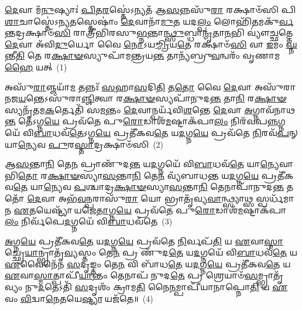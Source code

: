 \setcounter{anuvakam}{0}
\-\ul{𑌦𑍇}\-𑌵𑌾 𑌮᳴\-\ul{𑌨𑍁}\-𑌷𑍍𑌯𑌾𑌃॑ \ul{𑌪𑌿}\-𑌤\-\ul{𑌰}\-𑌸𑍍𑌤𑍇॑\-𑌽𑌨𑍍𑌯𑌤᳴ 𑌆\-\ul{𑌸}\-𑌨𑍍𑌨𑌸𑍁᳴\-\ul{𑌰𑌾} 𑌰𑌕𑍍𑌷𑌾𑍞᳴𑌸𑌿 𑌪𑌿\-\ul{𑌶𑌾}\-𑌚𑌾𑌸𑍍𑌤𑍇॑\-𑌽𑌨𑍍𑌯\-\ul{𑌤}\-𑌸𑍍𑌤𑍇𑌷𑌾𑌂॑ \ul{𑌦𑍇}\-𑌵𑌾𑌨𑌾᳴\-\ul{𑌮𑍁}\-𑌤 𑌯𑌦\-\ul{𑌲𑍍𑌪𑌂} 𑌲𑍋𑌹𑌿᳴\-\ul{𑌤}\-𑌮𑌕𑍁᳴\-\ul{𑌰𑍍𑌵}\-𑌨𑍍𑌤𑌦𑍍𑌰𑌕𑍍𑌷𑌾𑍞᳴\-\ul{𑌸𑌿} 𑌰𑌾𑌤𑍍𑌰𑍀᳴𑌭𑌿𑌰𑌸𑍁\-\ul{𑌭𑍍𑌨}\-𑌨𑍍𑌤𑌾\-\ul{𑌨𑍍𑌥𑍍𑌸𑍁}\-𑌬𑍍𑌧𑌾\-\ul{𑌨𑍍𑌮𑍃}\-𑌤𑌾\-\ul{𑌨}\-𑌭𑌿 𑌵𑍍𑌯𑍗॑\-\ul{𑌚𑍍𑌛}\-𑌤𑍍𑌤𑍇 \ul{𑌦𑍇}\-𑌵𑌾 𑌅᳴𑌵𑌿\-\ul{𑌦𑍁}\-𑌰𑍍𑌯𑍋 𑌵𑍈 \ul{𑌨𑍋}\-\-𑌽𑌯\-\ul{𑌮𑍍𑌮𑍍𑌰𑌿}\-𑌯\-\ul{𑌤𑍇} 𑌰𑌕𑍍𑌷𑌾𑍞᳴\-\ul{𑌸𑌿} 𑌵𑌾 \ul{𑌇}\-𑌮𑌂 \ul{𑌘𑍍𑌨}\-𑌨𑍍𑌤𑍀\-\ul{𑌤𑌿} 𑌤𑍇 𑌰\-\ul{𑌕𑍍𑌷𑌾}\-\-\ul{𑍟}\-𑌸𑍍𑌯𑍁𑌪𑌾᳴𑌮𑌨𑍍𑌤𑍍𑌰𑌯\-\ul{𑌨𑍍𑌤} 𑌤𑌾𑌨𑍍𑌯᳴𑌬𑍍𑌰𑍁\-\ul{𑌵}\-𑌨𑍍𑌵𑌰𑌂᳴ 𑌵𑍃𑌣𑌾𑌮\-\ul{𑌹𑍈} 𑌯𑌤𑍍~(1)

𑌅𑌸𑍁᳴\-\ul{𑌰𑌾}\-𑌞𑍍𑌜𑌯𑌾᳴\-\ul{𑌮} 𑌤𑌨𑍍𑌨𑌃᳴ \ul{𑌸}\-𑌹𑌾\-\ul{𑌸}\-𑌦𑌿\-\ul{𑌤𑌿} 𑌤\-\ul{𑌤𑍋} 𑌵𑍈 \ul{𑌦𑍇}\-𑌵𑌾 𑌅𑌸𑍁᳴𑌰𑌾𑌨𑌜\-\ul{𑌯}\-𑌨𑍍𑌤𑍇\-𑌽𑌸𑍁᳴𑌰𑌾\-\ul{𑌞𑍍𑌜𑌿}\-𑌤𑍍𑌵𑌾 𑌰\-\ul{𑌕𑍍𑌷𑌾}\-\-\ul{𑍟}\-𑌸𑍍𑌯𑌪𑌾᳴𑌨𑍁𑌦\-\ul{𑌨𑍍𑌤} 𑌤𑌾\-\ul{𑌨𑌿} 𑌰\-\ul{𑌕𑍍𑌷𑌾}\-\-\ul{𑍟}\-𑌸𑍍𑌯𑌨𑍃᳴𑌤𑌮\-\ul{𑌕}\-𑌰𑍍𑌤𑍇𑌤𑌿᳴ 𑌸\-\ul{𑌮}\-𑌨𑍍𑌤𑌂 \ul{𑌦𑍇}\-𑌵𑌾𑌨𑍍𑌪𑌰𑍍𑌯᳴𑌵𑌿\-\ul{𑌶}\-𑌨𑍍𑌤𑍇 \ul{𑌦𑍇}\-𑌵𑌾 \ul{𑌅}\-𑌗𑍍𑌨𑌾𑌵᳴𑌨𑌾𑌥\-\ul{𑌨𑍍𑌤} 𑌤𑍇॑\-𑌽𑌗𑍍𑌨\-\ul{𑌯𑍇} 𑌪𑍍𑌰𑌵᳴𑌤𑍇 𑌪𑍁\-\ul{𑌰𑍋}\-𑌡𑌾𑌶᳴\-\-\ul{𑌮}\-𑌷𑍍𑌟𑌾\-𑌕᳴𑌪𑌾\-\ul{𑌲𑌂} 𑌨𑌿𑌰᳴𑌵𑌪\-\ul{𑌨𑍍𑌨}\-𑌗𑍍𑌨𑌯𑍇᳴ 𑌵𑌿\-\ul{𑌬𑌾}\-𑌧𑌵᳴\-\ul{𑌤𑍇}\-\-𑌽𑌗𑍍𑌨\-\ul{𑌯𑍇} 𑌪𑍍𑌰𑌤𑍀᳴𑌕𑌵\-\ul{𑌤𑍇} 𑌯\-\ul{𑌦}\-𑌗𑍍𑌨\-\ul{𑌯𑍇} 𑌪𑍍𑌰𑌵᳴𑌤𑍇 \ul{𑌨𑌿}\-𑌰𑌵᳴\-\ul{𑌪}\-𑌨𑍍 𑌯𑌾\-\ul{𑌨𑍍𑌯𑍇}\-𑌵 \ul{𑌪𑍁}\-𑌰\-\ul{𑌸𑍍𑌤𑌾}\-𑌦𑍍𑌰𑌕𑍍𑌷𑌾𑍞᳴𑌸𑌿~(2)

𑌆\-\ul{𑌸}\-𑌨𑍍𑌤𑌾\-\ul{𑌨𑌿} 𑌤𑍇\-\ul{𑌨} 𑌪𑍍𑌰𑌾𑌣𑍁᳴𑌦\-\ul{𑌨𑍍𑌤} 𑌯\-\ul{𑌦}\-𑌗𑍍𑌨𑌯𑍇᳴ 𑌵𑌿\-\ul{𑌬𑌾}\-𑌧𑌵᳴\-\ul{𑌤𑍇} 𑌯𑌾\-\ul{𑌨𑍍𑌯𑍇}\-𑌵𑌾𑌭𑌿\-\ul{𑌤𑍋} 𑌰\-\ul{𑌕𑍍𑌷𑌾}\-\-\ul{𑍟}\-𑌸𑍍𑌯𑌾\-\ul{𑌸}\-𑌨𑍍𑌤𑌾\-\ul{𑌨𑌿} 𑌤𑍇\-\ul{𑌨} 𑌵𑍍𑌯᳴𑌬𑌾𑌧\-\ul{𑌨𑍍𑌤} 𑌯\-\ul{𑌦}\-𑌗𑍍𑌨\-\ul{𑌯𑍇} 𑌪𑍍𑌰𑌤𑍀᳴𑌕𑌵\-\ul{𑌤𑍇} 𑌯𑌾\-\ul{𑌨𑍍𑌯𑍇}\-𑌵 \ul{𑌪}\-𑌶𑍍𑌚𑌾𑌦𑍍𑌰\-\ul{𑌕𑍍𑌷𑌾}\-\-\ul{𑍟}\-𑌸𑍍𑌯𑌾\-\ul{𑌸}\-𑌨𑍍𑌤𑌾\-\ul{𑌨𑌿} 𑌤𑍇𑌨𑌾𑌪𑌾᳴𑌨𑍁𑌦\-\ul{𑌨𑍍𑌤} 𑌤𑌤𑍋᳴ \ul{𑌦𑍇}\-𑌵𑌾 𑌅𑌭᳴\-\ul{𑌵}\-𑌨𑍍𑌪𑌰𑌾𑌸𑍁᳴\-\ul{𑌰𑌾} 𑌯𑍋 𑌭𑍍𑌰𑌾𑌤𑍃᳴𑌵𑍍𑌯\-\ul{𑌵𑌾}\-𑌨𑍍𑌥𑍍𑌸𑍍𑌯𑌾𑌥𑍍𑌸 𑌸𑍍𑌪𑌰𑍍𑌧᳴𑌮𑌾𑌨 \ul{𑌏}\-𑌤𑌯𑍇𑌷𑍍𑌟𑍍𑌯𑌾᳴ 𑌯𑌜𑍇\-\ul{𑌤𑌾}\-𑌗𑍍𑌨\-\ul{𑌯𑍇} 𑌪𑍍𑌰𑌵᳴𑌤𑍇 𑌪𑍁\-\ul{𑌰𑍋}\-𑌡𑌾𑌶᳴\-\-\ul{𑌮}\-𑌷𑍍𑌟𑌾\-𑌕᳴𑌪𑌾\-\ul{𑌲𑌂} 𑌨𑌿𑌰𑍍𑌵᳴𑌪𑍇\-\ul{𑌦}\-𑌗𑍍𑌨𑌯𑍇᳴ 𑌵𑌿\-\ul{𑌬𑌾}\-𑌧𑌵᳴𑌤𑍇~(3)

\-\ul{𑌅}\-𑌗𑍍𑌨\-\ul{𑌯𑍇} 𑌪𑍍𑌰𑌤𑍀᳴𑌕𑌵\-\ul{𑌤𑍇} 𑌯\-\ul{𑌦}\-𑌗𑍍𑌨\-\ul{𑌯𑍇} 𑌪𑍍𑌰𑌵᳴𑌤𑍇 \ul{𑌨𑌿}\-𑌰𑍍𑌵𑌪᳴\-\ul{𑌤𑌿} 𑌯 \ul{𑌏}\-𑌵𑌾\-\ul{𑌸𑍍𑌮𑌾}\-𑌚𑍍𑌛𑍍𑌰𑍇\-\ul{𑌯𑌾}\-𑌨𑍍𑌭𑍍𑌰𑌾𑌤𑍃᳴\-\ul{𑌵𑍍𑌯}\-𑌸𑍍𑌤𑌂 𑌤𑍇\-\ul{𑌨} 𑌪𑍍𑌰 𑌣𑍁᳴𑌦\-\ul{𑌤𑍇} 𑌯\-\ul{𑌦}\-𑌗𑍍𑌨𑌯𑍇᳴ 𑌵𑌿\-\ul{𑌬𑌾}\-𑌧𑌵᳴\-\ul{𑌤𑍇} 𑌯 \ul{𑌏}\-𑌵𑍈𑌨𑍇᳴𑌨 \ul{𑌸}\-𑌦𑍃𑌙𑍍𑌤𑌂 𑌤𑍇\-\ul{𑌨} 𑌵𑌿 𑌬𑌾᳴𑌧\-\ul{𑌤𑍇} 𑌯\-\ul{𑌦}\-𑌗𑍍𑌨\-\ul{𑌯𑍇} 𑌪𑍍𑌰𑌤𑍀᳴𑌕𑌵\-\ul{𑌤𑍇} 𑌯 \ul{𑌏}\-𑌵𑌾\-\ul{𑌸𑍍𑌮𑌾}\-𑌤𑍍𑌪𑌾𑌪𑍀᳴\-\ul{𑌯𑌾}\-𑌨𑍍𑌤𑌂 𑌤𑍇𑌨𑌾𑌪᳴ 𑌨𑍁𑌦\-\ul{𑌤𑍇} 𑌪𑍍𑌰 𑌶𑍍𑌰𑍇𑌯𑌾𑍞᳴\-\ul{𑌸}\-𑌮𑍍𑌭𑍍𑌰𑌾𑌤𑍃᳴𑌵𑍍𑌯𑌂 𑌨𑍁\-\ul{𑌦}\-𑌤𑍇\-𑌽𑌤𑌿᳴ \ul{𑌸}\-𑌦𑍃𑌶𑌂᳴ 𑌕𑍍𑌰𑌾𑌮\-\ul{𑌤𑌿} 𑌨𑍈\-\ul{𑌨}\-𑌮𑍍𑌪𑌾𑌪𑍀᳴𑌯𑌾𑌨𑌾𑌪𑍍𑌨𑍋\-\ul{𑌤𑌿} 𑌯 \ul{𑌏}\-𑌵𑌂 \ul{𑌵𑌿}\-𑌦𑍍𑌵𑌾\-\ul{𑌨𑍇}\-𑌤𑌯𑍇\-\ul{𑌷𑍍𑌟𑍍𑌯𑌾} 𑌯𑌜᳴𑌤𑍇॥~(4)

